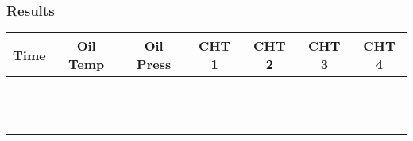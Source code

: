 % 
% 
%
\Large
 \subsubsection*{Results}
  \begin{tabular}{|c|c|c|c|c|c|c|}
    \hline
    Time&Oil Temp&Oil Press&CHT 1&CHT 2&CHT 3&CHT 4\\
    \hline
    \hline
    &&&&&&\\
    \hline
    &&&&&&\\
    \hline
    &&&&&&\\
    \hline
    &&&&&&\\
    \hline
    &&&&&&\\
    \hline
    &&&&&&\\
    \hline
    &&&&&&\\
    \hline
    &&&&&&\\
    \hline
    &&&&&&\\
    \hline
    &&&&&&\\
    \hline
    &&&&&&\\
    \hline
    &&&&&&\\
    \hline
    \end{tabular}
  \vspace{0.2 in}\\
  \normalsize
  